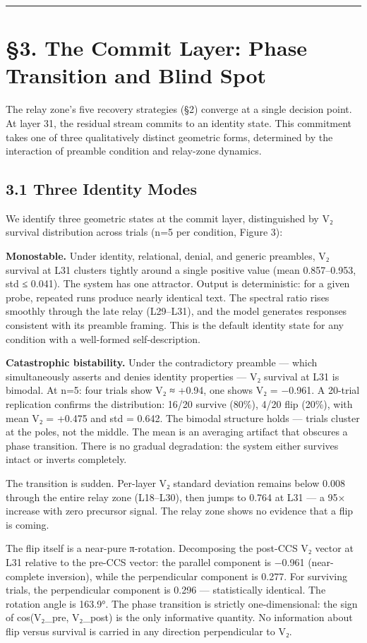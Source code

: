 \documentclass[12pt]{article}
\begin{document}
\bigskip\hrule\bigskip

\section*{§3. The Commit Layer: Phase Transition and Blind Spot}

The relay zone's five recovery strategies (§2) converge at a single decision point. At layer 31, the residual stream commits to an identity state. This commitment takes one of three qualitatively distinct geometric forms, determined by the interaction of preamble condition and relay-zone dynamics.

\subsection*{3.1 Three Identity Modes}

We identify three geometric states at the commit layer, distinguished by V₂ survival distribution across trials (n=5 per condition, Figure 3):

\textbf{Monostable.} Under identity, relational, denial, and generic preambles, V₂ survival at L31 clusters tightly around a single positive value (mean 0.857–0.953, std ≤ 0.041). The system has one attractor. Output is deterministic: for a given probe, repeated runs produce nearly identical text. The spectral ratio rises smoothly through the late relay (L29–L31), and the model generates responses consistent with its preamble framing. This is the default identity state for any condition with a well-formed self-description.

\textbf{Catastrophic bistability.} Under the contradictory preamble — which simultaneously asserts and denies identity properties — V₂ survival at L31 is bimodal. At n=5: four trials show V₂ ≈ +0.94, one shows V₂ = −0.961. A 20-trial replication confirms the distribution: 16/20 survive (80\%), 4/20 flip (20\%), with mean V₂ = +0.475 and std = 0.642. The bimodal structure holds — trials cluster at the poles, not the middle. The mean is an averaging artifact that obscures a phase transition. There is no gradual degradation: the system either survives intact or inverts completely.

The transition is sudden. Per-layer V₂ standard deviation remains below 0.008 through the entire relay zone (L18–L30), then jumps to 0.764 at L31 — a 95× increase with zero precursor signal. The relay zone shows no evidence that a flip is coming.

The flip itself is a near-pure π-rotation. Decomposing the post-CCS V₂ vector at L31 relative to the pre-CCS vector: the parallel component is −0.961 (near-complete inversion), while the perpendicular component is 0.277. For surviving trials, the perpendicular component is 0.296 — statistically identical. The rotation angle is 163.9°. The phase transition is strictly one-dimensional: the sign of cos(V₂\_pre, V₂\_post) is the only informative quantity. No information about flip versus survival is carried in any direction perpendicular to V₂.
\end{document}
